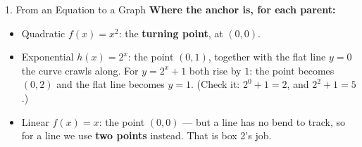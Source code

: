\documentclass[10pt]{article}
\begin{document}
\begin{notesbox}{1. From an Equation to a Graph}
\vspace{-2pt}
\textbf{Where the anchor is, for each parent:}
\begin{itemize}[leftmargin=1.3em, itemsep=2pt, topsep=3pt]
  \item Quadratic $f(x)=x^2$: the \textbf{turning point}, at $(0,0)$.
  \item Exponential $h(x)=2^x$: the point $(0,1)$, together with the flat line $y=0$ the curve
        crawls along. For $y=2^x+1$ both rise by $1$: the point becomes $(0,2)$ and the flat line
        becomes $y=1$. (Check it: $2^0+1=2$, and $2^2+1=5$.)
  \item Linear $f(x)=x$: the point $(0,0)$ --- but a line has no bend to track, so for a line we
        use \textbf{two points} instead. That is box 2's job.
\end{itemize}
\end{notesbox}

\vspace{0.10in}
\end{document}
